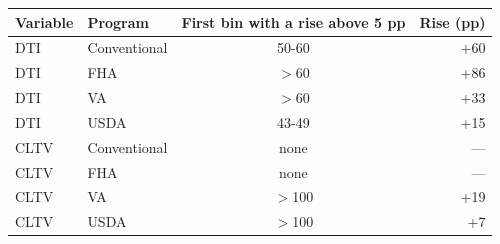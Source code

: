 \begin{tabular}{@{}llcr@{}}
\toprule
Variable & Program & First bin with a rise above 5 pp & Rise (pp) \\
\midrule
DTI & Conventional & 50-60 & +60 \\
DTI & FHA & $>$60 & +86 \\
DTI & VA & $>$60 & +33 \\
DTI & USDA & 43-49 & +15 \\
CLTV & Conventional & none & --- \\
CLTV & FHA & none & --- \\
CLTV & VA & $>$100 & +19 \\
CLTV & USDA & $>$100 & +7 \\
\bottomrule
\end{tabular}

